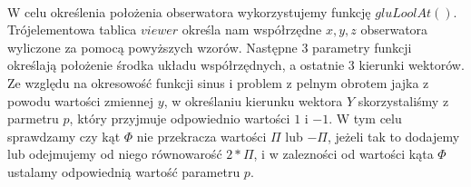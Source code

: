 \documentclass[wide,a4paper,titlepage,12pt] {article}
\begin{document}
\lstset{ %
    language=c++,                %
    basicstyle=\scriptsize,       %
    numbers=left,                   %
    numberstyle=\scriptsize,      %
    stepnumber=10,                   %
    numbersep=9pt,                  %
    showspaces=false,               %
    showstringspaces=false,         %
    showtabs=false,                 %
    breaklines=true,                %
    }
    
\paragraph{}
 W celu określenia położenia obserwatora wykorzystujemy funkcję $gluLoolAt()$. Trójelementowa tablica $viewer$ określa nam współrzędne $x,y,z$ obserwatora wyliczone za pomocą powyższych wzorów. Następne 3 parametry funkcji określają położenie środka układu współrzędnych, a ostatnie 3 kierunki wektorów. Ze względu na okresowość funkcji sinus i problem z pelnym obrotem jajka z powodu wartości zmiennej $y$, w określaniu kierunku wektora $Y$ skorzystaliśmy z parmetru $p$, który przyjmuje odpowiednio wartości $1$ i $-1$. W tym celu sprawdzamy czy kąt $\Phi$ nie przekracza wartości $\Pi$ lub $-\Pi$, jeżeli tak to dodajemy lub odejmujemy od niego równowarość $2*\Pi$, i w zalezności od wartości kąta $\Phi$ ustalamy odpowiednią wartość parametru $p$.
\end{document}
